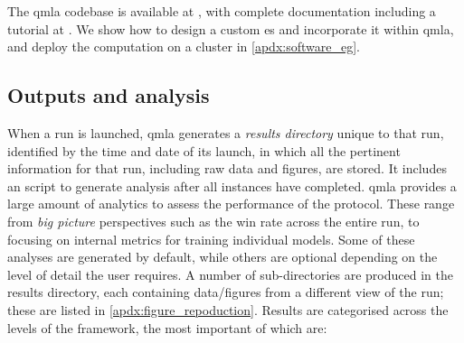 The \gls{qmla} codebase is available at \cite{flynn2021QMLA},  
    with complete documentation including a tutorial at \cite{qmla_docs}. 
We show how to design a custom \gls{es} and incorporate it within \gls{qmla}, 
    and deploy the computation on a cluster in \cref{apdx:software_eg}.

\subsection{Outputs and analysis}\label{sec:qmla_outputs}
When a \gls{run} is launched, \gls{qmla} generates a \emph{\gls{results directory}} unique to that \gls{run}, 
    identified by the time and date of its launch,
    in which all the pertinent information for that \gls{run}, including raw data and figures, are stored. 
It includes an  script to generate analysis after all \glspl{instance} have completed\footnotemark. 
\gls{qmla} provides a large amount of analytics to assess the performance of the protocol. 
These range from \emph{big picture} perspectives such as the  \gls{win rate}  across the entire \gls{run}, 
    to focusing on internal metrics for training individual models.
Some of these analyses are generated by default, while others are optional depending on the 
    level of detail the user requires. 
A number of sub-directories are produced in the \gls{results directory}, 
    each containing data/figures from a different view of the \gls{run};
    these are listed in \cref{apdx:figure_repoduction}.
Results are categorised across the levels of the framework, the most important of which are:

